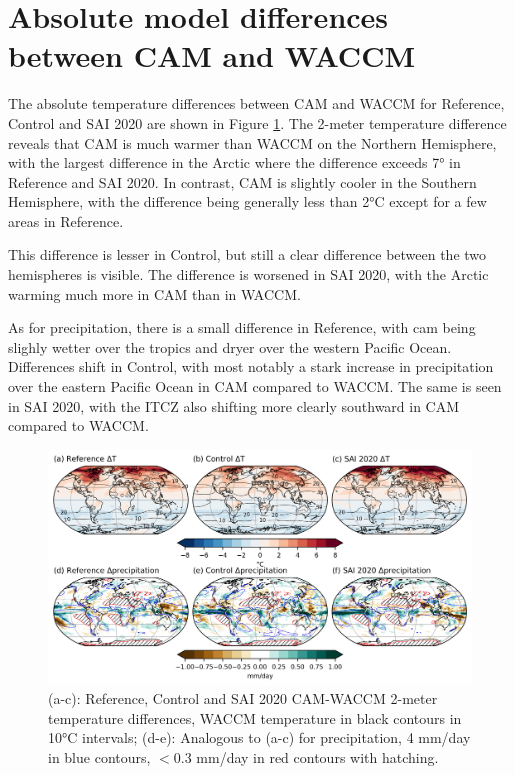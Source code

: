 \section{Absolute model differences between CAM and WACCM}\label{app_modeldiff}
The absolute temperature differences between CAM and WACCM for Reference, Control and SAI 2020 are shown in Figure \ref{fig:CAM_WACCM}. The 2-meter temperature difference reveals that CAM is much warmer than WACCM on the Northern Hemisphere, with the largest difference in the Arctic where the difference exceeds 7° in Reference and SAI 2020. In contrast, CAM is slightly cooler in the Southern Hemisphere, with the difference being generally less than 2°C except for a few areas in Reference.

This difference is lesser in Control, but still a clear difference between the two hemispheres is visible. The difference is worsened in SAI 2020, with the Arctic warming much more in CAM than in WACCM. 

As for precipitation, there is a small difference in Reference, with cam being slighly wetter over the tropics and dryer over the western Pacific Ocean. Differences shift in Control, with most notably a stark increase in precipitation over the eastern Pacific Ocean in CAM compared to WACCM. The same is seen in SAI 2020, with the ITCZ also shifting more clearly southward in CAM compared to WACCM. 

\begin{figure}[H]
	\centering
	\includegraphics[width=0.95\linewidth]{images/CAM_WACCM.png}
	\caption{(a-c): Reference, Control and SAI 2020 CAM-WACCM 2-meter temperature differences, WACCM temperature in black contours in 10°C intervals; (d-e): Analogous to (a-c) for precipitation, 4 mm/day in blue contours, $<0.3$ mm/day in red contours with hatching.}
	\label{fig:CAM_WACCM}
\end{figure}

